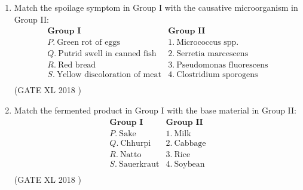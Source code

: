 \documentclass[14pt]{extarticle}
\begin{document}
\begin{flushleft}
\begin{enumerate}
\item Match the spoilage symptom in Group I with the causative microorganism in Group II:
\[
\begin{array}{ll}
\textbf{Group I} & \textbf{Group II} \\
P. \ \text{Green rot of eggs} & 1. \ \text{Micrococcus spp.} \\
Q. \ \text{Putrid swell in canned fish} & 2. \ \text{Serretia marcescens} \\
R. \ \text{Red bread} & 3. \ \text{Pseudomonas fluorescens} \\
S. \ \text{Yellow discoloration of meat} & 4. \ \text{Clostridium sporogens} \\
\end{array}
\]
\hfill(GATE XL 2018 )\\
\begin{enumerate}[label=(\Alph*)]
\end{enumerate}

\item Match the fermented product in Group I with the base material in Group II:
\[
\begin{array}{ll}
\textbf{Group I} & \textbf{Group II} \\
P. \ \text{Sake} & 1. \ \text{Milk} \\
Q. \ \text{Chhurpi} & 2. \ \text{Cabbage} \\
R. \ \text{Natto} & 3. \ \text{Rice} \\
S. \ \text{Sauerkraut} & 4. \ \text{Soybean} \\
\end{array}
\]
\hfill(GATE XL 2018 )\\

\begin{enumerate}[label=(\Alph*)]
\end{enumerate}


\end{enumerate}
\end{flushleft}
\end{document}

